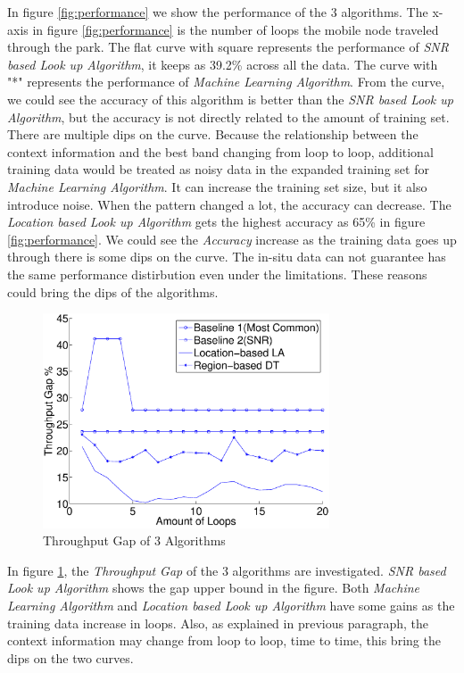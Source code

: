 In figure \ref{fig:performance} we show the performance of the 3 algorithms. 
The x-axis in figure \ref{fig:performance} is the number of loops the mobile node traveled through the park. 
The flat curve with square represents the performance of \emph{SNR based Look up Algorithm}, it keeps as 39.2\% across all the data.
The curve with "*" represents the performance of \emph{Machine Learning Algorithm}. From the curve, we could see the accuracy of this algorithm is better than the \emph{SNR based Look up Algorithm}, but the accuracy is not directly related to the amount of training set. 
There are multiple dips on the curve. 
Because the relationship between the context information and the best band changing from loop to loop, additional training data would be treated as noisy data in the expanded training set for \emph{Machine Learning Algorithm}. It can increase the training set size, but it also introduce noise. When the pattern changed a lot, the accuracy can decrease.
The \emph{Location based Look up Algorithm} gets the highest accuracy as 65\% in figure \ref{fig:performance}. We could see the \emph{Accuracy} increase as the training data goes up through there is some dips on the curve. The in-situ data can not guarantee has the same performance distirbution even under the limitations. These reasons could bring the dips of the algorithms. 


\begin{figure}
\centering
\includegraphics[width=85mm]{figure/performance_gap}
\caption{Throughput Gap of 3 Algorithms}
\label{fig:performance_gap}
\end{figure}

In figure \ref{fig:performance_gap}, the \emph{Throughput Gap} of the 3 algorithms are investigated. \emph{SNR based Look up Algorithm} shows the gap upper bound in the figure. Both \emph{Machine Learning Algorithm} and \emph{Location based Look up Algorithm} have some gains as the training data increase in loops. Also, as explained in previous paragraph, the context information may change from loop to loop, time to time, this bring the dips on the two curves. 


